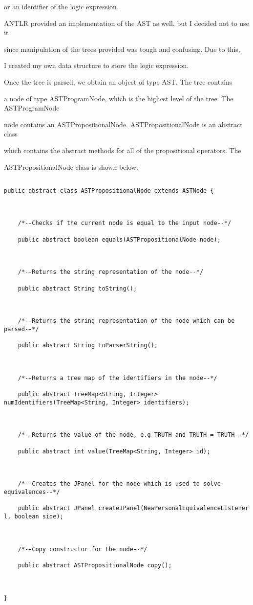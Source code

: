 \documentclass{report}
\begin{document}
or an identifier of the logic expression.



ANTLR provided an implementation of the AST as well, but I decided not to use it

since manipulation of the trees provided was tough and confusing. Due to this,

I created my own data structure to store the logic expression.



Once the tree is parsed, we obtain an object of type AST. The tree contains

a node of type ASTProgramNode, which is the highest level of the tree. The ASTProgramNode

node contains an ASTPropositionalNode. ASTPropositionalNode is an abstract class

which contains the abstract methods for all of the propositional operators. The

ASTPropositionalNode class is shown below:



\begin{lstlisting}[caption=Methods held in a Propositional Node, label=find]

public abstract class ASTPropositionalNode extends ASTNode {



	/*--Checks if the current node is equal to the input node--*/

	public abstract boolean equals(ASTPropositionalNode node);



	/*--Returns the string representation of the node--*/

	public abstract String toString();



	/*--Returns the string representation of the node which can be parsed--*/

	public abstract String toParserString();



	/*--Returns a tree map of the identifiers in the node--*/

	public abstract TreeMap<String, Integer> numIdentifiers(TreeMap<String, Integer> identifiers);

	

	/*--Returns the value of the node, e.g TRUTH and TRUTH = TRUTH--*/

	public abstract int value(TreeMap<String, Integer> id);



	/*--Creates the JPanel for the node which is used to solve equivalences--*/

	public abstract JPanel createJPanel(NewPersonalEquivalenceListener l, boolean side);

	

	/*--Copy constructor for the node--*/

	public abstract ASTPropositionalNode copy();



}

\end{lstlisting}
\end{document}
